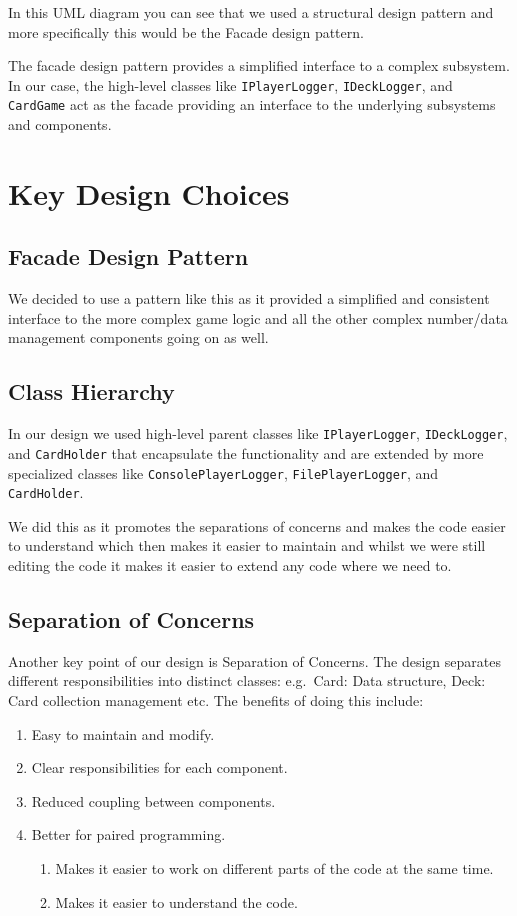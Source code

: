 \documentclass{article}
\begin{document}
In this UML diagram you can see that we used a structural design pattern and more specifically this would be the Facade design pattern.

The facade design pattern provides a simplified interface to a complex subsystem.
In our case, the high-level classes like \texttt{IPlayerLogger}, \texttt{IDeckLogger}, and \texttt{CardGame} act as the facade providing an interface to the underlying subsystems and components.

\section{Key Design Choices}
\subsection{Facade Design Pattern}
We decided to use a pattern like this as it provided a simplified and consistent interface to the more complex game logic and all the other complex number/data management components going on as well.

\subsection{Class Hierarchy}
In our design we used high-level parent classes like \texttt{IPlayerLogger}, \texttt{IDeckLogger}, and \texttt{CardHolder} that encapsulate the functionality and are extended by more specialized classes like \texttt{ConsolePlayerLogger}, \texttt{FilePlayerLogger}, and \texttt{CardHolder}.

We did this as it promotes the separations of concerns and makes the code easier to understand which then makes it easier to maintain and whilst we were still editing the code it makes it easier to extend any code where we need to.

\subsection{Separation of Concerns}
Another key point of our design is Separation of Concerns.
The design separates different responsibilities into distinct classes: e.g.\ Card: Data structure, Deck: Card collection management etc.
The benefits of doing this include:
\begin{enumerate}
    \item Easy to maintain and modify.
    \item Clear responsibilities for each component.
    \item Reduced coupling between components.
    \item Better for paired programming.
          \begin{enumerate}
              \item Makes it easier to work on different parts of the code at the same time.
              \item Makes it easier to understand the code.
          \end{enumerate}
\end{enumerate}
\end{document}
